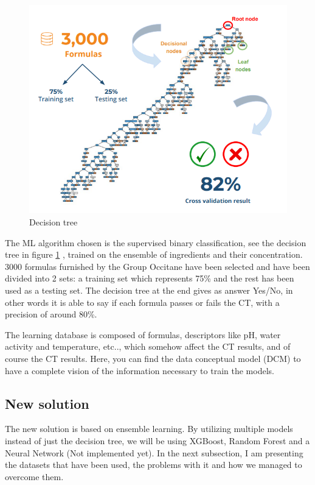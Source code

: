 \documentclass[a4paper,12pt,twoside]{report}
\begin{document}
\begin{figure}
		\includegraphics[width=\textwidth]{images/binaryTree}
	\caption[Current Decision Tree for CT prediction]{Decision tree}
\label{Decision tree}
\end{figure}
The ML algorithm chosen is the supervised binary classification, see the decision tree in figure \ref{Decision tree} , trained on the ensemble of ingredients and their concentration. 3000 formulas furnished by the Group Occitane have been selected and have been divided into 2 sets: a training set which represents 75\% and the rest has been used as a testing set.
The decision tree at the end gives as answer Yes/No, in other words it is able to say if each formula passes or fails the CT, with a precision of around 80\%.

The learning database is composed of formulas, descriptors like pH, water activity and temperature, etc.., which somehow affect the CT results, and of course the CT results. Here, you can find the data conceptual model (DCM) to have a complete vision of the information necessary to train the models.
\subsection{New solution}
The new solution is based on ensemble learning. By utilizing multiple models instead of just the decision tree, we will be using XGBoost, Random Forest and a Neural Network (Not implemented yet). In the next subsection, I am presenting the datasets that have been used, the problems with it and how we managed to overcome them.
\end{document}
